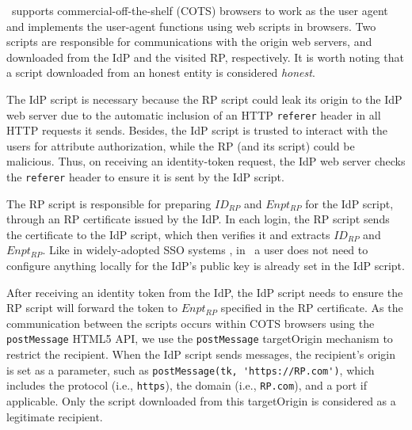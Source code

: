 \usso\ supports commercial-off-the-shelf (COTS) browsers to work as the user agent and implements the user-agent functions using web scripts in browsers. Two scripts are responsible for communications with the origin web servers,
 and downloaded from the IdP and the visited RP, respectively. It is worth noting that a script downloaded from an honest entity is considered \emph{honest}.

The IdP script is necessary because the RP script could leak its origin to the IdP web server due to the automatic inclusion of an HTTP \verb+referer+ header in all HTTP requests it sends.
Besides, the IdP script is trusted to interact with the users for attribute authorization,
  while the RP (and its script) could be malicious.
Thus, on receiving an identity-token request, the IdP web server checks the \verb+referer+ header to ensure it is sent by the IdP script.

The RP script is responsible for preparing $ID_{RP}$ and $Enpt_{RP}$ for the IdP script, through an RP certificate issued by the IdP. %
In each login, the RP script sends the certificate to the IdP script, which then verifies it and extracts $ID_{RP}$ and $Enpt_{RP}$.
Like in widely-adopted SSO systems \cite{OpenIDConnect, rfc6749, SAML, SAMLIdentifier}, in \usso\ a user does not need to configure anything locally for the IdP's public key is already set in the IdP script.

After receiving an identity token from the IdP, the IdP script needs to ensure the RP script will forward the token to $Enpt_{RP}$ %
specified in the RP certificate.
As the communication between the scripts occurs within COTS browsers using the \verb+postMessage+ HTML5 API, %
we use the \verb+postMessage+ targetOrigin mechanism \cite{postm-targeto} to restrict the recipient. %
 When the IdP script sends messages, the recipient's origin is set as a parameter, such as \verb+postMessage(tk, 'https://RP.com')+, which includes the protocol (i.e., \verb+https+), the domain (i.e., \verb+RP.com+), and a port if applicable.
Only the script downloaded from this targetOrigin is considered as a legitimate recipient.


